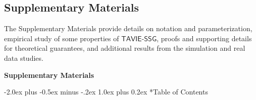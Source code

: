 \documentclass[12pt]{article}
\makeatletter
\def\section{\@startsection{section}{1}{\z@}
  {-2.0ex plus -0.5ex minus -.2ex} %
  {1.0ex plus 0.2ex}               %
  {\normalfont\Large\bfseries}}
\numberwithin{equation}{section}
\newcommand{\tssg}{\mathsf{TAVIE}\text{-}\mathsf{SSG}}
\makeatother
\begin{document}

\subsection*{Supplementary Materials}
%
The Supplementary Materials provide details on notation and parameterization, empirical study of some properties of $\tssg$, proofs and supporting details for theoretical guarantees, and additional results from the simulation and real data studies.





\clearpage
\appendix

\setcounter{section}{0}
\setcounter{equation}{0}
\setcounter{figure}{0}
\setcounter{table}{0}
\setcounter{assumption}{0}

\renewcommand\thesection{\Alph{section}}
\renewcommand\thesubsection{\thesection.\arabic{subsection}}
\renewcommand\thesubsubsection{\thesubsection.\arabic{subsubsection}}

\renewcommand{\theequation}{S\thesection.\arabic{equation}}
\renewcommand{\thelemma}{\thesection.\arabic{lemma}}
\renewcommand{\thedefinition}{\thesection.\arabic{definition}}
\renewcommand{\theremark}{\thesection.\arabic{remark}}
\renewcommand{\thefigure}{S\arabic{figure}}
\renewcommand{\thetable}{S\arabic{table}}


\startcontents[supplement]


\renewcommand\thesection{\Alph{section}}

\begin{center}
{\LARGE\bf Supplementary Materials}
\end{center}

\section*{Table of Contents}
\end{document}
